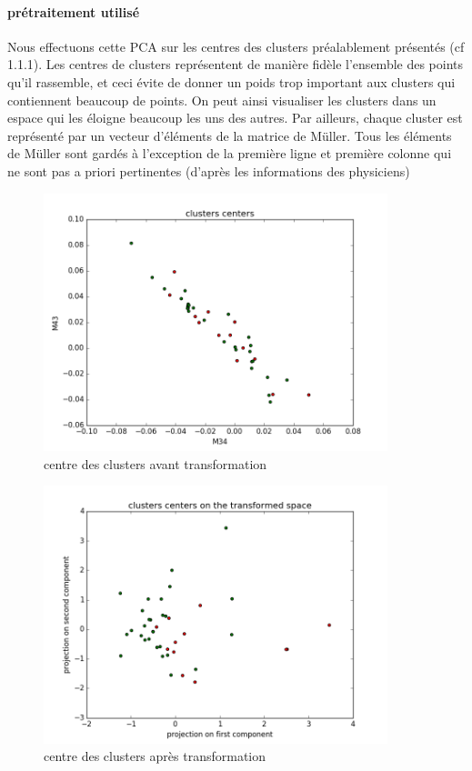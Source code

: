\documentclass[a4paper,10pt]{report}
\begin{document}
\paragraph{prétraitement utilisé}
Nous effectuons cette PCA sur les centres des clusters préalablement présentés (cf 1.1.1). Les centres de clusters représentent de manière fidèle l'ensemble des points qu'il rassemble, et ceci évite de donner un poids trop important aux clusters qui contiennent beaucoup de points. On peut ainsi visualiser les clusters dans un espace qui les éloigne beaucoup les uns des autres. Par ailleurs, chaque cluster est représenté par un vecteur d'éléments de la matrice de Müller. Tous les éléments de Müller sont gardés à l’exception de la première ligne et première colonne qui ne sont pas a priori pertinentes (d'après les informations des physiciens)
\begin{figure}[htb]
  \caption{centre des clusters avant transformation}
  \centering
  \includegraphics[width=10cm]{PCA_0.png}
\end{figure}
\begin{figure}[htb]
  \caption{centre des clusters après transformation}
  \centering
  \includegraphics[width=10cm]{PCA_1.png}
\end{figure}
\end{document}
